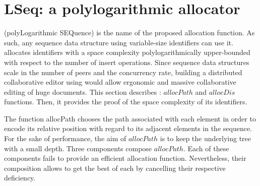 

\section{LSeq: a polylogarithmic allocator}
\label{sec:proposal}

\LSEQ (polyLogarithmic SEQuence) is the name of the proposed allocation
function. As such, any sequence data structure using variable-size identifiers
can use it. \LSEQ allocates identifiers with a space complexity
polylogarithmically upper-bounded with respect to the number of insert
operations. Since sequence data structures scale in the number of peers and the
concurrency rate, building a distributed collaborative editor using \LSEQ would
allow ergonomic and massive collaborative editing of huge documents. This
section describes \LSEQ: $allocPath$ and $allocDis$ functions. Then, it provides
the proof of the space complexity of its identifiers.

\begin{asparadesc}
\item [The function allocPath] chooses the path associated with each element in
  order to encode its relative position with regard to its adjacent elements in
  the sequence. For the sake of performance, the aim of $allocPath$ is to keep
  the underlying tree with a small depth. Three components compose
  $allocPath$. Each of these components fails to provide an efficient
  allocation function. Nevertheless, their composition allows to get the best
  of each by cancelling their respective deficiency.
\end{asparadesc}

